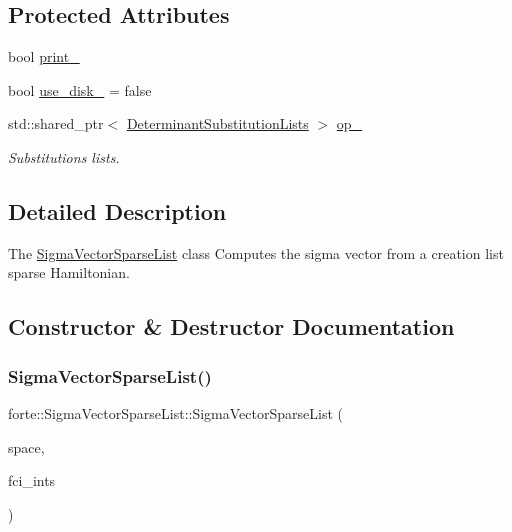 \subsection*{Protected Attributes}
\begin{DoxyCompactItemize}
\item 
bool \mbox{\hyperlink{classforte_1_1_sigma_vector_sparse_list_a2f4a0e344433f682c646ad784d3bc935}{print\+\_\+}}
\item 
bool \mbox{\hyperlink{classforte_1_1_sigma_vector_sparse_list_a6d3d86b1e74d0425575d6dcf10b8e138}{use\+\_\+disk\+\_\+}} = false
\item 
std\+::shared\+\_\+ptr$<$ \mbox{\hyperlink{classforte_1_1_determinant_substitution_lists}{Determinant\+Substitution\+Lists}} $>$ \mbox{\hyperlink{classforte_1_1_sigma_vector_sparse_list_a9f0acf36369eb61a81614350379ccab3}{op\+\_\+}}
\begin{DoxyCompactList}\small\item\em Substitutions lists. \end{DoxyCompactList}\end{DoxyCompactItemize}


\subsection{Detailed Description}
The \mbox{\hyperlink{classforte_1_1_sigma_vector_sparse_list}{Sigma\+Vector\+Sparse\+List}} class Computes the sigma vector from a creation list sparse Hamiltonian. 

\subsection{Constructor \& Destructor Documentation}
\mbox{\label{classforte_1_1_sigma_vector_sparse_list_a725dd8c7ac42cd22d445fc17025acb44}} 
\subsubsection{\texorpdfstring{Sigma\+Vector\+Sparse\+List()}{SigmaVectorSparseList()}}
{\footnotesize\ttfamily forte\+::\+Sigma\+Vector\+Sparse\+List\+::\+Sigma\+Vector\+Sparse\+List (\begin{DoxyParamCaption}\item[{const \mbox{\hyperlink{classforte_1_1_determinant_hash_vec}{Determinant\+Hash\+Vec}} \&}]{space,  }\item[{std\+::shared\+\_\+ptr$<$ \mbox{\hyperlink{classforte_1_1_active_space_integrals}{Active\+Space\+Integrals}} $>$}]{fci\+\_\+ints }\end{DoxyParamCaption})}

